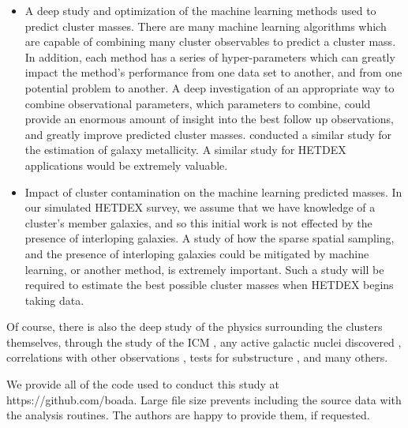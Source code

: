 \begin{itemize}
	\item A deep study and optimization of the machine learning methods used to predict cluster masses. There are many machine learning algorithms which are capable of combining many cluster observables to predict a cluster mass. In addition, each method has a series of hyper-parameters which can greatly impact the method's performance from one data set to another, and from one potential problem to another. A deep investigation of an appropriate way to combine observational parameters, which parameters to combine, could provide an enormous amount of insight into the best follow up observations, and greatly improve predicted cluster masses. \cite{Acquaviva2016} conducted a similar study for the estimation of galaxy metallicity. A similar study for HETDEX applications would be extremely valuable.
	\item Impact of cluster contamination on the machine learning predicted masses. In our simulated HETDEX survey, we assume that we have knowledge of a cluster's member galaxies, and so this initial work is not effected by the presence of interloping galaxies. A study of how the sparse spatial sampling, and the presence of interloping galaxies  could be mitigated by machine learning, or another method, is extremely important. Such a study will be required to estimate the best possible cluster masses when HETDEX begins taking data. 
\end{itemize} 

Of course, there is also the deep study of the physics surrounding the clusters themselves, through the study of the ICM , any active galactic nuclei discovered , correlations with other observations , tests for substructure , and many others. 

We provide all of the code used to conduct this study at https://github.com/boada. Large file size prevents including the source data with the analysis routines. The authors are happy to provide them, if requested.

